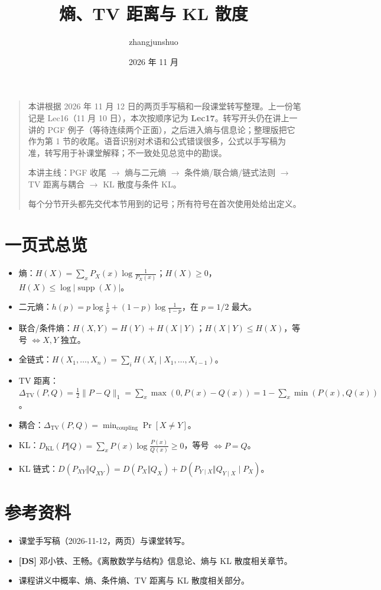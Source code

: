 \documentclass[UTF8,a4paper,11pt]{ctexart}
\title{熵、TV 距离与 KL 散度}\author{zhangjunshuo}\date{2026 年 11 月}
\begin{document}
\maketitle
\begin{quote}
本讲根据 2026 年 11 月 12 日的两页手写稿和一段课堂转写整理。上一份笔记是 Lec16（11 月 10 日），本次按顺序记为 \textbf{Lec17}。转写开头仍在讲上一讲的 PGF 例子（等待连续两个正面），之后进入熵与信息论；整理版把它作为第 1 节的收尾。语音识别对术语和公式错误很多，公式以手写稿为准，转写用于补课堂解释；不一致处见总览中的勘误。

本讲主线：PGF 收尾 $\to$ 熵与二元熵 $\to$ 条件熵/联合熵/链式法则 $\to$ TV 距离与耦合 $\to$ KL 散度与条件 KL。

每个分节开头都先交代本节用到的记号；所有符号在首次使用处给出定义。
\end{quote}
\tableofcontents\clearpage






\section*{一页式总览}
\begin{itemize}
\item 熵：$H(X)=\sum_xP_X(x)\log\frac1{P_X(x)}$；$H(X)\ge0$，$H(X)\le\log|\operatorname{supp}(X)|$。
\item 二元熵：$h(p)=p\log\frac1p+(1-p)\log\frac1{1-p}$，在 $p=1/2$ 最大。
\item 联合/条件熵：$H(X,Y)=H(Y)+H(X\mid Y)$；$H(X\mid Y)\le H(X)$，等号 $\iff X,Y$ 独立。
\item 全链式：$H(X_1,\dots,X_n)=\sum_iH(X_i\mid X_1,\dots,X_{i-1})$。
\item TV 距离：$\Delta_{\mathrm{TV}}(P,Q)=\frac12\|P-Q\|_1=\sum_x\max(0,P(x)-Q(x))=1-\sum_x\min(P(x),Q(x))$。
\item 耦合：$\Delta_{\mathrm{TV}}(P,Q)=\min_{\text{coupling}}\Pr[X\ne Y]$。
\item KL：$D_{\mathrm{KL}}(P\Vert Q)=\sum_xP(x)\log\frac{P(x)}{Q(x)}\ge0$，等号 $\iff P=Q$。
\item KL 链式：$D(P_{XY}\Vert Q_{XY})=D(P_X\Vert Q_X)+D(P_{Y\mid X}\Vert Q_{Y\mid X}\mid P_X)$。
\end{itemize}

\section*{参考资料}
\begin{itemize}
\item 课堂手写稿（2026-11-12，两页）与课堂转写。
\item \textbf{[DS]} 邓小铁、王畅。《离散数学与结构》信息论、熵与 KL 散度相关章节。
\item 课程讲义中概率、熵、条件熵、TV 距离与 KL 散度相关部分。
\end{itemize}
\end{document}
